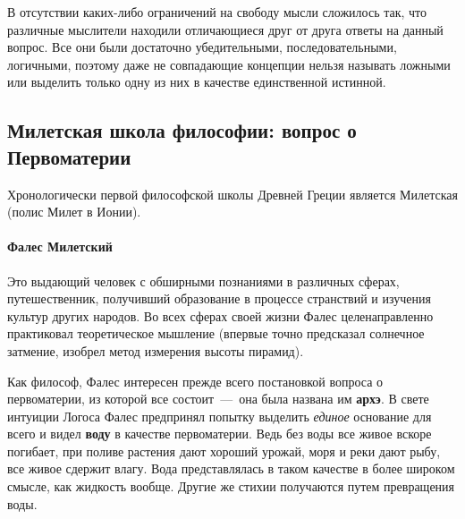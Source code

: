 В отсутствии каких-либо ограничений на
свободу мысли сложилось так, что различные мыслители находили отличающиеся друг
от друга ответы на данный вопрос. Все они были достаточно убедительными,
последовательными, логичными, поэтому даже не совпадающие концепции нельзя
называть ложными или выделить только одну из них в качестве единственной
истинной.

\subsection{Милетская школа философии: вопрос о Первоматерии}

Хронологически первой философской школы Древней Греции является Милетская (полис Милет в Ионии). 

\paragraph{Фалес Милетский}

Это выдающий человек с обширными познаниями в различных сферах, путешественник, получивший образование в процессе странствий и изучения культур других народов. 
Во всех сферах своей жизни Фалес целенаправленно практиковал теоретическое мышление (впервые точно предсказал солнечное затмение, изобрел метод измерения высоты пирамид). 

Как философ, Фалес интересен прежде всего постановкой вопроса о первоматерии, из которой все состоит~---~она была названа им \textbf{архэ}. 
В свете интуиции Логоса Фалес предпринял попытку выделить \textit{единое} основание для всего и видел \textbf{воду} в качестве первоматерии. 
Ведь без воды все живое вскоре погибает, при поливе растения дают хороший урожай, моря и реки дают рыбу, все живое сдержит влагу.  Вода представлялась в таком качестве в более широком смысле, как жидкость вообще.  Другие же стихии получаются путем превращения воды.

